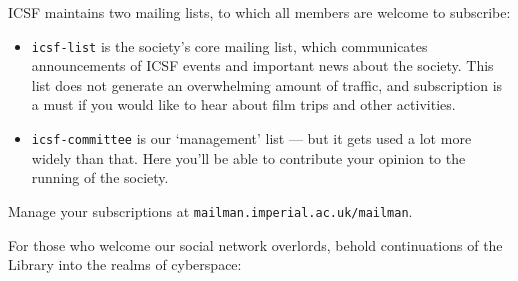 

ICSF maintains two mailing lists, to which all members are welcome to
subscribe:

\begin{itemize}
\item \texttt{icsf-list}
is the society’s core mailing list, which communicates announcements
of ICSF events and important news about the society. This list does
not generate an overwhelming amount of traffic, and subscription is a
must if you would like to hear about film trips and other activities.

\item \texttt{icsf-committee}
is our ‘management’ list --- but it gets used a lot more
widely than that. Here you’ll be able to contribute your opinion to
the running of the society.
\end{itemize}

Manage your subscriptions at \texttt{mailman.imperial.ac.uk/mailman}.

For those who welcome our social network overlords, behold
continuations of the Library into the realms of cyberspace:





